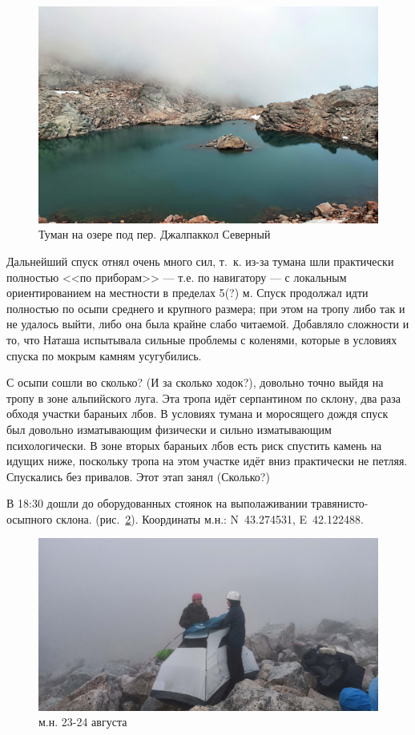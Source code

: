 \begin{figure}[h!]	
	\centering
	\includegraphics[angle=0, width=0.7\linewidth]{../pics/IMG_20240823_170306}
	\caption{Туман на озере под пер. Джалпаккол Северный}
	\label{fig:IMG_20240823_170306}
\end{figure} 

Дальнейший спуск отнял очень много сил, т.~к. из-за тумана шли практически полностью <<по приборам>> --- т.е. по навигатору --- с локальным ориентированием на местности в пределах 5\alert{(?)} м. Спуск продолжал идти полностью по осыпи среднего и крупного размера; при этом на тропу либо так и не удалось выйти, либо она была крайне слабо читаемой. Добавляло сложности и то, что Наташа испытывала сильные проблемы с коленями, которые в условиях спуска по мокрым камням усугубились. 

С осыпи сошли \alert{во сколько? (И за сколько ходок?)}, довольно точно выйдя на тропу в зоне альпийского луга. Эта тропа идёт серпантином по склону, два раза обходя участки бараньих лбов. В условиях тумана и моросящего дождя спуск был довольно изматывающим физически и сильно изматывающим психологически. В зоне вторых бараньих лбов есть риск спустить камень на идущих ниже, поскольку тропа на этом участке идёт вниз практически не петляя. Спускались без привалов. Этот этап занял \alert{(Сколько?)}

В 18:30 дошли до оборудованных стоянок на выполаживании травянисто-осыпного склона. (рис.~\ref{fig:IMG_20240823_184041}). Координаты м.н.: N~43.274531\degree, E~42.122488\degree.

\begin{figure}[h!]	
	\centering
	\includegraphics[angle=0, width=0.7\linewidth]{../pics/IMG_20240823_184041}
	\caption{м.н. 23-24 августа}
	\label{fig:IMG_20240823_184041}
\end{figure}

